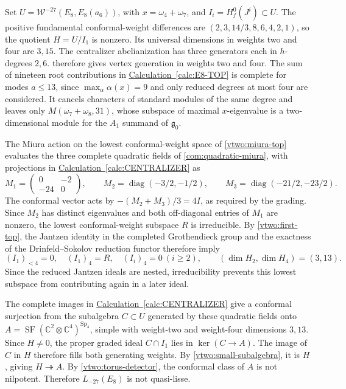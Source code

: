 \documentclass[11pt,a4paper]{amsart}
\numberwithin{equation}{section}
\theoremstyle{definition}
\theoremstyle{remark}
\newcommand{\C}{\mathbb C}
\newcommand{\g}{\mathfrak g}
\newcommand{\SF}{\operatorname{SF}}
\newcommand{\Sp}{\operatorname{Sp}}
\begin{document}
Set $U=\mathcal W^{-27}(E_8,E_8(a_6))$, with $x=\omega_4+\omega_7$,
and $I_i=H_f^0(J^i)\subset U$. The positive fundamental conformal-weight differences are
$(2,3,14/3,8,6,4,2,1)$, so the quotient $H=U/I_1$ is nonzero.
Its universal dimensions in weights two and four are $3,15$.
The centralizer abelianization has three generators each in $h$-degrees
$2,6$.  therefore gives vertex generation in
weights two and four. The sum of nineteen root contributions in
\hyperref[calc:E8-TOP]{Calculation~\ref*{calc:E8-TOP}} is complete for modes $a\le13$, since
$\max_\alpha\alpha(x)=9$ and only reduced degrees at most four are considered. It cancels
characters of standard modules of the same degree and leaves only
$M(\omega_7+\omega_8,31)$, whose subspace of maximal $x$-eigenvalue is a two-dimensional module
for the $A_1$ summand of $\g_0$.

The Miura action on the lowest conformal-weight space of \cref{vtwo:miura-top} evaluates
the three complete quadratic fields of \cref{com:quadratic-miura},
with projections in \hyperref[calc:CENTRALIZER]{Calculation~\ref*{calc:CENTRALIZER}} as
$$
 M_1=\begin{pmatrix}0&-2\\-24&0\end{pmatrix},\qquad
 M_2=\operatorname{diag}(-3/2,-1/2),\qquad
 M_3=\operatorname{diag}(-21/2,-23/2).
$$
The conformal vector acts by $-(M_2+M_3)/3=4I$, as required by the grading. Since $M_2$ has
distinct eigenvalues and both off-diagonal entries of $M_1$ are nonzero,
the lowest conformal-weight subspace $R$ is irreducible. By
\cref{vtwo:first-top}, the Jantzen identity in the completed Grothendieck
group and the exactness of the Drinfeld--Sokolov reduction functor
therefore imply
$$
 (I_1)_{<4}=0,\quad(I_1)_4=R,\quad(I_i)_4=0\ (i\ge2),
 \qquad(\dim H_2,\dim H_4)=(3,13).
$$
Since the reduced Jantzen ideals are nested, irreducibility prevents this
lowest subspace from contributing again in a later ideal.

The complete images in \hyperref[calc:CENTRALIZER]{Calculation~\ref*{calc:CENTRALIZER}}
give a conformal surjection from the subalgebra $C\subset U$
generated by these quadratic fields onto $A=\SF(\C^2\otimes\C^4)^{\Sp_4}$, simple with weight-two and
weight-four dimensions $3,13$. Since $H\ne0$, the proper graded ideal
$C\cap I_1$ lies in $\ker(C\to A)$. The image of $C$ in $H$ therefore
fills both generating weights. By \cref{vtwo:small-subalgebra}, it is
$H$, giving $H\twoheadrightarrow A$. By \cref{vtwo:torus-detector},
the conformal class of $A$ is not nilpotent. Therefore $L_{-27}(E_8)$
is not quasi-lisse.
\end{document}
